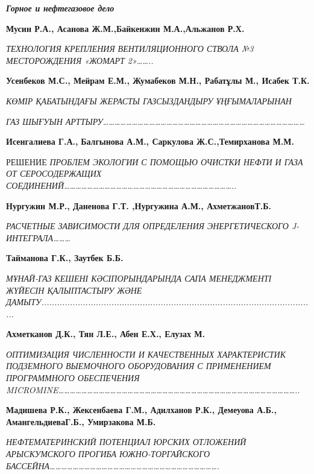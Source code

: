 \emph{{\bfseries Горное и нефтегазовое дело}}

{\bfseries Мусин Р.А., Асанова Ж.М.,Байкенжин М.А.,Альжанов Р.Х.}

\emph{ТЕХНОЛОГИЯ КРЕПЛЕНИЯ ВЕНТИЛЯЦИОННОГО СТВОЛА №3 МЕСТОРОЖДЕНИЯ
«ЖОМАРТ 2»\ldots\ldots..}

{\bfseries Усенбеков М.С., Мейрам Е.М., Жумабеков М.Н., Рабатұлы М., Исабек
Т.К.}

\emph{КӨМІР ҚАБАТЫНДАҒЫ ЖЕРАСТЫ ГАЗСЫЗДАНДЫРУ ҰҢҒЫМАЛАРЫНАН}

\emph{ГАЗ ШЫҒУЫН
АРТТЫРУ\ldots\ldots\ldots\ldots\ldots\ldots\ldots\ldots\ldots\ldots\ldots\ldots\ldots\ldots\ldots\ldots\ldots\ldots\ldots\ldots\ldots\ldots\ldots\ldots\ldots\ldots\ldots\ldots\ldots\ldots\ldots\ldots\ldots\ldots\ldots{}}

{\bfseries Исенгалиева Г.А.,} {\bfseries Балгынова А.М., Саркулова
Ж.С.,Темирханова М.М.}

РЕШЕНИЕ \emph{ПРОБЛЕМ ЭКОЛОГИИ С ПОМОЩЬЮ ОЧИСТКИ НЕФТИ И ГАЗА ОТ
СЕРОСОДЕРЖАЩИХ
СОЕДИНЕНИЙ\ldots\ldots\ldots\ldots\ldots\ldots\ldots\ldots\ldots\ldots\ldots\ldots\ldots\ldots\ldots\ldots\ldots\ldots\ldots\ldots\ldots\ldots\ldots\ldots\ldots\ldots\ldots\ldots\ldots..}

{\bfseries Нургужин М.Р., Даненова Г.Т. ,Нургужина А.М., АхметжановТ.Б.}

\emph{РАСЧЕТНЫЕ ЗАВИСИМОСТИ ДЛЯ ОПРЕДЕЛЕНИЯ ЭНЕРГЕТИЧЕСКОГО
J-ИНТЕГРАЛА\ldots\ldots\ldots{}}

{\bfseries Тайманова Г.К., Заутбек Б.Б.}

\emph{МҰНАЙ-ГАЗ КЕШЕНІ КӘСІПОРЫНДАРЫНДА САПА МЕНЕДЖМЕНТІ ЖҮЙЕСІН
ҚАЛЫПТАСТЫРУ ЖӘНЕ
ДАМЫТУ..........................................................................................................}

{\bfseries Ахметканов Д.К., Тян Л.Е., Абен Е.Х., Елузах М.}

\emph{ОПТИМИЗАЦИЯ ЧИСЛЕННОСТИ И КАЧЕСТВЕННЫХ ХАРАКТЕРИСТИК ПОДЗЕМНОГО
ВЫЕМОЧНОГО ОБОРУДОВАНИЯ С ПРИМЕНЕНИЕМ ПРОГРАММНОГО ОБЕСПЕЧЕНИЯ
MICROMINE\ldots\ldots\ldots\ldots\ldots\ldots\ldots\ldots\ldots\ldots\ldots\ldots\ldots\ldots\ldots\ldots\ldots\ldots\ldots\ldots\ldots\ldots\ldots\ldots\ldots\ldots\ldots\ldots\ldots\ldots\ldots\ldots\ldots\ldots\ldots\ldots\ldots\ldots\ldots\ldots\ldots..}

{\bfseries Мадишева Р.К., Жексенбаева Г.М., Адилханов Р.К., Демеуова А.Б.,
АмангельдиеваГ.Б., Умирзакова М.Б.}

\emph{НЕФТЕМАТЕРИНСКИЙ ПОТЕНЦИАЛ ЮРСКИХ ОТЛОЖЕНИЙ АРЫСКУМСКОГО ПРОГИБА
ЮЖНО-ТОРГАЙСКОГО
БАССЕЙНА\ldots\ldots\ldots\ldots\ldots\ldots\ldots\ldots\ldots\ldots\ldots\ldots\ldots\ldots\ldots\ldots\ldots\ldots\ldots\ldots\ldots\ldots\ldots\ldots\ldots\ldots\ldots\ldots\ldots.}

